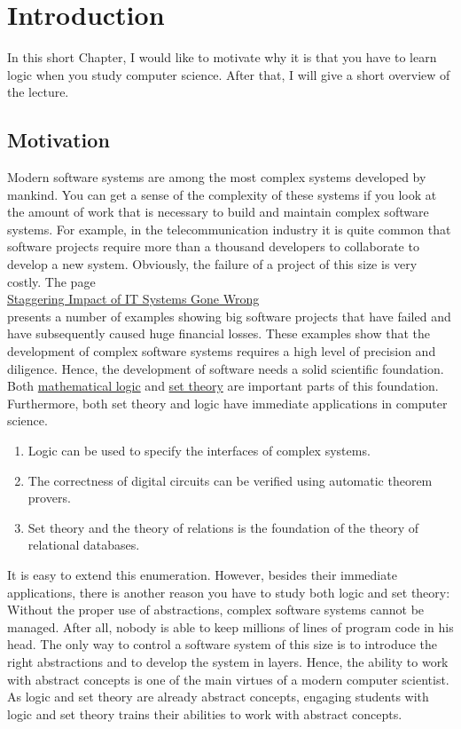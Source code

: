 \chapter{Introduction}
In this short Chapter, I would like to motivate why it is that you have to learn logic when you study computer
science.  After that, I will give a short overview of the lecture.

\section{Motivation}
Modern software systems are among the most complex systems developed by mankind.  You can get a
sense of the complexity of these systems if you look at the amount of work that is necessary to
build and maintain complex software systems.  For example, in the telecommunication industry it is 
quite common that software projects require more than a thousand developers to collaborate to
develop a new system.  Obviously, the failure of a project of this size is very costly.
The page
\\[0.2cm]
\hspace*{1.3cm}
\href{http://spectrum.ieee.org/static/the-staggering-impact-of-it-systems-gone-wrong}{Staggering Impact of IT Systems Gone Wrong} 
\\[0.2cm]
presents a number of examples showing big software projects that have failed and have subsequently caused huge
financial losses.  These examples show that the development of complex software systems requires a high level
of precision and diligence.  Hence, the development of software needs a solid scientific
foundation.  Both \href{https://en.wikipedia.org/wiki/Mathematical_logic}{mathematical logic} and 
\href{https://en.wikipedia.org/wiki/Set_theory}{set theory}
are important parts of this foundation.  Furthermore, both set theory and logic have immediate applications in
computer science. 
\begin{enumerate}
\item Logic can be used to specify the interfaces of complex systems.  
\item The correctness of digital circuits can be verified using automatic theorem provers.
\item Set theory and the theory of relations is the foundation of the theory of relational databases.
\end{enumerate}
It is easy to extend this enumeration.  However, besides their immediate applications, 
there is another reason you have to study both logic and set theory: Without the proper use of
{\color{blue}abstractions}, complex software systems cannot be managed.  After all, nobody is able to keep
millions of lines of program code in his head.  The only way to control a software system of this
size is to introduce the right abstractions and to develop the system in layers.  Hence, the ability
to work with abstract concepts is one of the main virtues of a modern computer scientist.  As logic
and set theory are already abstract concepts, engaging students with logic and set theory trains
their abilities to work with abstract concepts.

